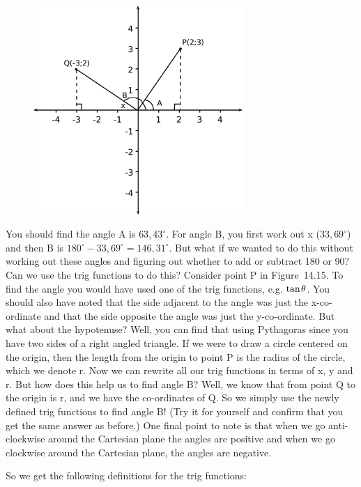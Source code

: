	\begin{figure}[H] %
    \begin{center}
    \label{m39411*id63458!!!underscore!!!media}\label{m39411*id63458!!!underscore!!!printimage}\includegraphics[width=300px]{col11306.imgs/m39411_trigfunc1.png} %
      \vspace{2pt}
    \vspace{.1in}
    \end{center}
 \end{figure}       \par \label{m39411*eip-9}You should find the angle A is $63,{43}^{\circ }$. For angle B, you first work out x ($33,{69}^{\circ }$) and then B is ${180}^{\circ }-33,{69}^{\circ }=146,{31}^{\circ }$. But what if we wanted to do this without working out these angles and figuring out whether to add or subtract 180 or 90? Can we use the trig functions to do this? Consider point P in Figure~14.15. To find the angle you would have used one of the trig functions, e.g. $\mathrm{tan}\phantom{\rule{1pt}{0ex}}\theta $. You should also have noted that the side adjacent to the angle was just the x-co-ordinate and that the side opposite the angle was just the y-co-ordinate. But what about the hypotenuse? Well, you can find that using Pythagoras since you have two sides of a right angled triangle. If we were to draw a circle centered on the origin, then the length from the origin to point P is the radius of the circle, which we denote r. Now we can rewrite all our trig functions in terms of x, y and r. But how does this help us to find angle B? Well, we know that from point Q to the origin is r, and we have the co-ordinates of Q. So we simply use the newly defined trig functions to find angle B! (Try it for yourself and confirm that you get the same answer as before.) One final point to note is that when we go anti-clockwise around the Cartesian plane the angles are positive and when we go clockwise around the Cartesian plane, the angles are negative. \par \label{m39411*eip-634}So we get the following definitions for the trig functions:
